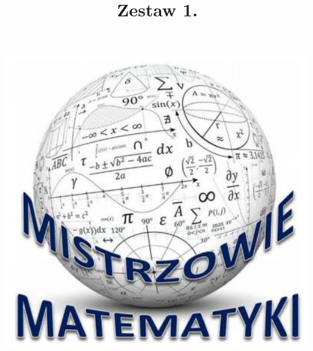 \documentclass[10pt]{article}
\title{Zestaw 1. }
\author{}
\date{}
\begin{document}
\maketitle
\begin{center}
\includegraphics[max width=\textwidth]{2024_11_21_ba1800e73998f6feb233g-1(2)}
\end{center}
\end{document}
